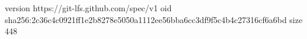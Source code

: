 version https://git-lfs.github.com/spec/v1
oid sha256:2c36c4c0921ff1e2b8278e5050a1112ee56bba6cc3df9f5c4b4c27316cf6a6bd
size 448
